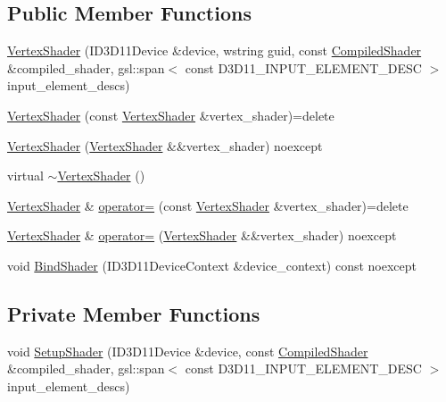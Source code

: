 \subsection*{Public Member Functions}
\begin{DoxyCompactItemize}
\item 
\mbox{\hyperlink{classmage_1_1rendering_1_1_vertex_shader_a6d7f46adfb3fa28c356490b24318007a}{Vertex\+Shader}} (I\+D3\+D11\+Device \&device, wstring guid, const \mbox{\hyperlink{classmage_1_1rendering_1_1_compiled_shader}{Compiled\+Shader}} \&compiled\+\_\+shader, gsl\+::span$<$ const D3\+D11\+\_\+\+I\+N\+P\+U\+T\+\_\+\+E\+L\+E\+M\+E\+N\+T\+\_\+\+D\+E\+SC $>$ input\+\_\+element\+\_\+descs)
\item 
\mbox{\hyperlink{classmage_1_1rendering_1_1_vertex_shader_a9236dfa05a74b64bdb0cb404b917d533}{Vertex\+Shader}} (const \mbox{\hyperlink{classmage_1_1rendering_1_1_vertex_shader}{Vertex\+Shader}} \&vertex\+\_\+shader)=delete
\item 
\mbox{\hyperlink{classmage_1_1rendering_1_1_vertex_shader_a2123d4bf4054ecb0de0c0491c59df0c1}{Vertex\+Shader}} (\mbox{\hyperlink{classmage_1_1rendering_1_1_vertex_shader}{Vertex\+Shader}} \&\&vertex\+\_\+shader) noexcept
\item 
virtual \mbox{\hyperlink{classmage_1_1rendering_1_1_vertex_shader_a4c57483ff1995a235472787b72ad4577}{$\sim$\+Vertex\+Shader}} ()
\item 
\mbox{\hyperlink{classmage_1_1rendering_1_1_vertex_shader}{Vertex\+Shader}} \& \mbox{\hyperlink{classmage_1_1rendering_1_1_vertex_shader_a4dff0bd19a0242300fbde0cc0a4497c4}{operator=}} (const \mbox{\hyperlink{classmage_1_1rendering_1_1_vertex_shader}{Vertex\+Shader}} \&vertex\+\_\+shader)=delete
\item 
\mbox{\hyperlink{classmage_1_1rendering_1_1_vertex_shader}{Vertex\+Shader}} \& \mbox{\hyperlink{classmage_1_1rendering_1_1_vertex_shader_a2d63073a65a136f2afa898af67eedb8b}{operator=}} (\mbox{\hyperlink{classmage_1_1rendering_1_1_vertex_shader}{Vertex\+Shader}} \&\&vertex\+\_\+shader) noexcept
\item 
void \mbox{\hyperlink{classmage_1_1rendering_1_1_vertex_shader_aa7090e902c68760713513fbfa33a1553}{Bind\+Shader}} (I\+D3\+D11\+Device\+Context \&device\+\_\+context) const noexcept
\end{DoxyCompactItemize}
\subsection*{Private Member Functions}
\begin{DoxyCompactItemize}
\item 
void \mbox{\hyperlink{classmage_1_1rendering_1_1_vertex_shader_a09e717d181f09bd4e50a758bd804705b}{Setup\+Shader}} (I\+D3\+D11\+Device \&device, const \mbox{\hyperlink{classmage_1_1rendering_1_1_compiled_shader}{Compiled\+Shader}} \&compiled\+\_\+shader, gsl\+::span$<$ const D3\+D11\+\_\+\+I\+N\+P\+U\+T\+\_\+\+E\+L\+E\+M\+E\+N\+T\+\_\+\+D\+E\+SC $>$ input\+\_\+element\+\_\+descs)
\end{DoxyCompactItemize}
